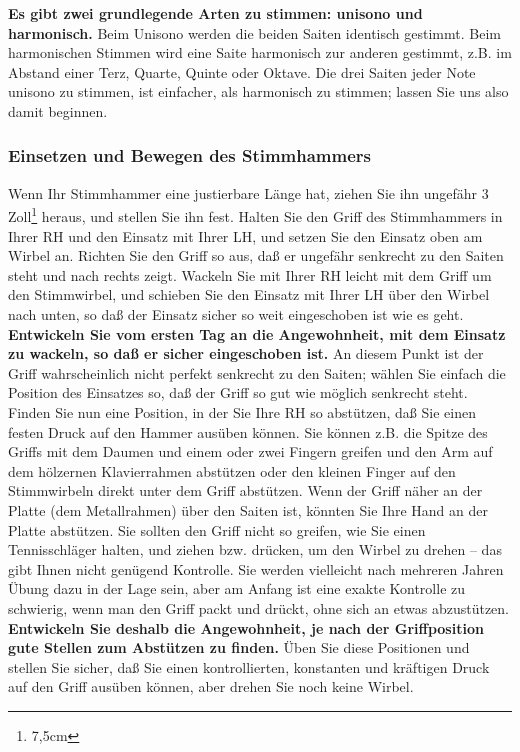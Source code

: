 \textbf{Es gibt zwei grundlegende Arten zu stimmen: unisono und harmonisch.}
Beim Unisono werden die beiden Saiten identisch gestimmt.
Beim harmonischen Stimmen wird eine Saite harmonisch zur anderen gestimmt, z.B. im Abstand einer Terz, Quarte, Quinte oder Oktave.
Die drei Saiten jeder Note unisono zu stimmen, ist einfacher, als harmonisch zu stimmen; lassen Sie uns also damit beginnen.
 

\label{c2_5b}
\subsubsection{Einsetzen und Bewegen des Stimmhammers}
\label{c2_5_hamm} 

Wenn Ihr Stimmhammer eine justierbare Länge hat, ziehen Sie ihn ungefähr 3 Zoll\footnote{7,5cm} heraus, und stellen Sie ihn fest.
Halten Sie den Griff des Stimmhammers in Ihrer RH und den Einsatz mit Ihrer LH, und setzen Sie den Einsatz oben am Wirbel an.
Richten Sie den Griff so aus, daß er ungefähr senkrecht zu den Saiten steht und nach rechts zeigt.
Wackeln Sie mit Ihrer RH leicht mit dem Griff um den Stimmwirbel, und schieben Sie den Einsatz mit Ihrer LH über den Wirbel nach unten, so daß der Einsatz sicher so weit eingeschoben ist wie es geht.
\textbf{Entwickeln Sie vom ersten Tag an die Angewohnheit, mit dem Einsatz zu wackeln, so daß er sicher eingeschoben ist.}
An diesem Punkt ist der Griff wahrscheinlich nicht perfekt senkrecht zu den Saiten; wählen Sie einfach die Position des Einsatzes so, daß der Griff so gut wie möglich senkrecht steht.
Finden Sie nun eine Position, in der Sie Ihre RH so abstützen, daß Sie einen festen Druck auf den Hammer ausüben können.
Sie können z.B. die Spitze des Griffs mit dem Daumen und einem oder zwei Fingern greifen und den Arm auf dem hölzernen Klavierrahmen abstützen oder den kleinen Finger auf den Stimmwirbeln direkt unter dem Griff abstützen.
Wenn der Griff näher an der Platte (dem Metallrahmen) über den Saiten ist, könnten Sie Ihre Hand an der Platte abstützen.
Sie sollten den Griff nicht so greifen, wie Sie einen Tennisschläger halten, und ziehen bzw. drücken, um den Wirbel zu drehen -- das gibt Ihnen nicht genügend Kontrolle.
Sie werden vielleicht nach mehreren Jahren Übung dazu in der Lage sein, aber am Anfang ist eine exakte Kontrolle zu schwierig, wenn man den Griff packt und drückt, ohne sich an etwas abzustützen.
\textbf{Entwickeln Sie deshalb die Angewohnheit, je nach der Griffposition gute Stellen zum Abstützen zu finden.}
Üben Sie diese Positionen und stellen Sie sicher, daß Sie einen kontrollierten, konstanten und kräftigen Druck auf den Griff ausüben können, aber drehen Sie noch keine Wirbel.

